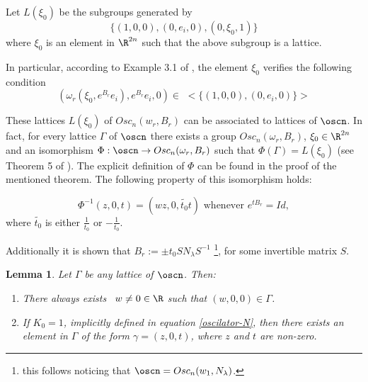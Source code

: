 \documentclass[11pt]{amsart}
\theoremstyle{plain}
\newtheorem{lem}[thm]{Lemma}
\theoremstyle{definition}
\theoremstyle{remark}
\begin{document}
	Let $L(\xi_0)$ be the subgroups generated by $$\{ (1,0,0),(0,e_i,0),(0,\xi_0, 1) \}$$ where $\xi_0$ is an element in $\R^{2n}$ such that the above subgroup is a lattice. 
	
In particular, according to Example 3.1 of \cite{MF}, the element $\xi_0$ verifies the following condition 
	\begin{equation}\label{xi-condition}
		(\omega_r(\xi_0, e^{B_r}e_i), e^{B_r} e_i, 0) \in \,\, <\{ (1,0,0),(0,e_i,0) \}>
	\end{equation}
	
	
	These lattices $L(\xi_0)$ of $Osc_n(w_r, B_r)$ can be associated to lattices of $\oscn$. In fact, for every lattice $\Gamma$ of $\oscn$ there exists a group $Osc_n(\omega_r, B_r)$, $\xi_0 \in \R^{2n}$ and an isomorphism $\Phi: \oscn \rightarrow Osc_n(\omega_r, B_r)$ such that $\Phi(\Gamma) = L(\xi_0)$ (see Theorem 5 of \cite{MF}). 	
	The explicit definition of $\Phi$ can be found in the proof of the mentioned theorem. The following property of this isomorphism holds:
	
	\begin{equation} \label{condition-exp}
		\Phi^{-1}(z,0,t) = (w z, 0, \widetilde{t_0} t ) \mbox{ whenever } e^{t B_r} = Id,
		\end{equation}
    where $\widetilde{t_0}$ is either $\frac{1}{t_0}$ or $-\frac{1}{t_0}$.

	Additionally it is shown that $B_r := \pm t_0 S N_{\lambda} S^{-1}$ \footnote{this follows noticing that $\oscn = Osc_n(w_{1}, N_{\lambda})$.}, for some invertible matrix $S$. 
	
	\begin{lem}\cite{MF}\label{oscilador-elementos}  %
		Let $\Gamma$ be any lattice of $\oscn$. Then:
		\begin{enumerate}
			\item There always exists \, $w \neq 0 \in \R$ such that $(w,0,0) \in \Gamma$.
			\item If $K_0=1$, implicitly defined in equation \ref{oscilator-N}, then there exists an element in $\Gamma$ of the form $\gamma = (z, 0, t)$, where $z$ and $t$ are non-zero.
		\end{enumerate}
	\end{lem} 
	
\end{document}
